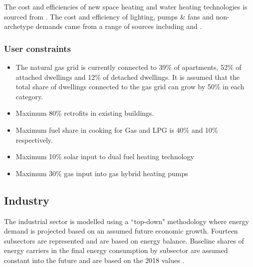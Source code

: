 \documentclass[gmd,manuscript]{copernicus}
\begin{document}
The cost and efficiencies of new space heating and water heating technologies is sourced from \citet{DEA2020}. The cost and efficiency of lighting, pumps \& fans and non-archetype demands came from a range of sources including
\citet{SEAISustainableAuthorityofIreland2018} and \citet{ecotopten}.

\subsubsection{User constraints}
\begin{itemize}
 \item The natural gas grid is currently connected to 39\% of apartments, 52\% of attached dwellings and 12\% of detached dwellings. It is assumed that the total share of dwellings connected to the gas grid can grow by 50\% in each category. 
\item Maximum 80\% retrofits in existing buildings.
\item Maximum fuel share in cooking for Gas and LPG is 40\% and 10\% respectively.
\item Maximum 10\% solar input to dual fuel heating technology
\item Maximum 30\% gas input into gas hybrid heating pumps

\end{itemize}



\subsection{Industry}
\label{ss:industry}
The industrial sector is modelled using a ``top-down" methodology where energy demand is projected based on an assumed future economic growth. Fourteen subsectors are represented and are based on \citet{SEAI2019} energy balance. Baseline shares of energy carriers in the final energy consumption by subsector are assumed constant into the future and are based on the 2018 values \citep{SEAI2019}. 
\end{document}
